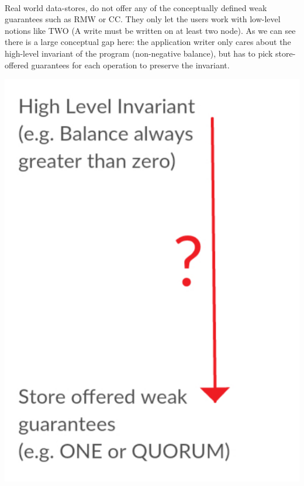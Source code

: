\documentclass[runningheads]{llncs}
\begin{document}
\paragraph{}
Real world data-stores, do not offer any of the conceptually defined weak guarantees such as RMW or CC. They only let the users work with low-level notions like TWO (A write must be written on at least two node). As we can see there is a large conceptual gap here: the application writer only cares about the high-level invariant of the program (non-negative balance), but has to pick store-offered guarantees for each operation to preserve the invariant. 
\begin{center}
\includegraphics[scale = 0.385]{gap.pdf}
\end{center}
\end{document}
